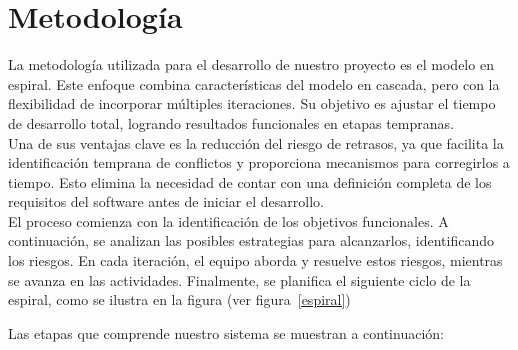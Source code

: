 \section{Metodología}
\label{cap:reqUsr}

	La metodología utilizada para el desarrollo de nuestro proyecto es el modelo en espiral. Este enfoque combina características del modelo en cascada, pero con la flexibilidad de incorporar múltiples iteraciones. Su objetivo es ajustar el tiempo de desarrollo total, logrando resultados funcionales en etapas tempranas. \\ 
	
	Una de sus ventajas clave es la reducción del riesgo de retrasos, ya que facilita la identificación temprana de conflictos y proporciona mecanismos para corregirlos a tiempo. Esto elimina la necesidad de contar con una definición completa de los requisitos del software antes de iniciar el desarrollo. \\
	
	El proceso comienza con la identificación de los objetivos funcionales. A continuación, se analizan las posibles estrategias para alcanzarlos, identificando los riesgos. En cada iteración, el equipo aborda y resuelve estos riesgos, mientras se avanza en las actividades. Finalmente, se planifica el siguiente ciclo de la espiral, como se ilustra en la figura (ver figura~\ref{espiral})


	Las etapas que comprende nuestro sistema se muestran a continuación:
	
